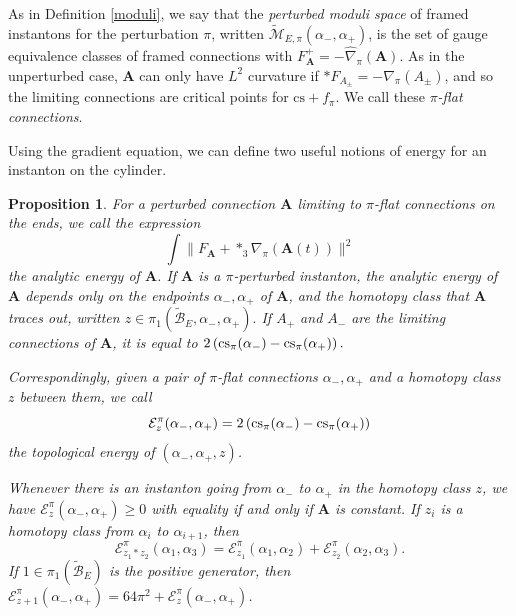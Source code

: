 \documentclass{memo-l}
\newtheorem{proposition}[theorem]{Proposition}
\theoremstyle{definition}
\theoremstyle{remark}
\numberwithin{section}{chapter}
\numberwithin{equation}{chapter}
\begin{document}
As in Definition \ref{moduli}, we say that the \textit{perturbed moduli space} of framed instantons for the perturbation $\pi$, written $\widetilde{\mathcal M}_{E,\pi}(\alpha_-, \alpha_+)$, is the set of gauge equivalence classes of framed connections with $F_{\mathbf{A}}^+ = - \widehat \nabla_\pi(\mathbf{A})$. As in the unperturbed case, $\mathbf{A}$ can only have $L^2$ curvature if $*F_{A_\pm} = - \nabla_\pi(A_{\pm})$, and so the limiting connections are critical points for $\text{cs}+f_\pi$. We call these \emph{$\pi$-flat connections}.

Using the gradient equation, we can define two useful notions of energy for an instanton on the cylinder.

\begin{proposition}\label{energy}For a perturbed connection $\mathbf{A}$ limiting to $\pi$-flat connections on the ends, we call the expression $$\int \|F_{\mathbf{A}} + *_3\nabla_\pi(\mathbf{A}(t))\|^2$$ the \emph{analytic energy} of $\mathbf{A}$. If $\mathbf{A}$ is a $\pi$-perturbed instanton, the analytic energy of $\mathbf{A}$ depends only on the endpoints $\alpha_-, \alpha_+$ of $\mathbf{A}$, and the homotopy class that $\mathbf{A}$ traces out, written $z \in \pi_1(\widetilde{\mathcal B}_E, \alpha_-, \alpha_+).$ If $A_+$ and $A_-$ are the limiting connections of $\mathbf{A}$, it is equal to $2\left(\textup{cs}_\pi(\alpha_-) - \textup{cs}_\pi(\alpha_+)\right).$ 

Correspondingly, given a pair of $\pi$-flat connections $\alpha_-, \alpha_+$ and a homotopy class $z$ between them, we call $$\mathcal E^\pi_z(\alpha_-, \alpha_+)=2\left(\textup{cs}_\pi(\alpha_-) - \textup{cs}_\pi(\alpha_+)\right)$$ the \textit{topological energy} of $(\alpha_-, \alpha_+, z)$. 

Whenever there is an instanton going from $\alpha_-$ to $\alpha_+$ in the homotopy class $z$, we have $\mathcal E^\pi_z(\alpha_-, \alpha_+) \geq 0$  with equality if and only if $\mathbf{A}$ is constant. If $z_i$ is a homotopy class from $\alpha_i$ to $\alpha_{i+1}$, then $$\mathcal E^\pi_{z_1 \ast z_2}(\alpha_1, \alpha_3) = \mathcal E^\pi_{z_1}(\alpha_1, \alpha_2) + \mathcal E^\pi_{z_2}(\alpha_2,\alpha_3).$$ If $1 \in \pi_1(\widetilde{\mathcal B}_E)$ is the positive generator, then $\mathcal E^\pi_{z+1}(\alpha_-, \alpha_+) = 64\pi^2 + \mathcal E^\pi_z(\alpha_-, \alpha_+)$. 
\end{proposition}
\end{document}
